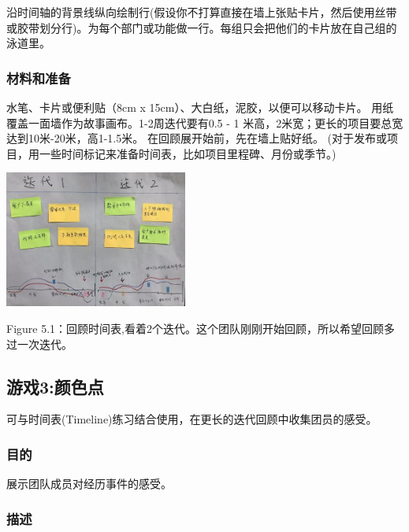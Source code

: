 沿时间轴的背景线纵向绘制行(假设你不打算直接在墙上张贴卡片，然后使用丝带或胶带划分行)。为每个部门或功能做一行。每组只会把他们的卡片放在自己组的泳道里。

\hypertarget{ux6750ux6599ux548cux51c6ux5907-1}{%
\subsubsection{材料和准备}\label{ux6750ux6599ux548cux51c6ux5907-1}}

水笔、卡片或便利贴（8cm x 15cm）、大白纸，泥胶，以便可以移动卡片。
用纸覆盖一面墙作为故事画布。1-2周迭代要有0.5 - 1
米高，2米宽；更长的项目要总宽达到10米-20米，高1-1.5米。
在回顾展开始前，先在墙上贴好纸。
(对于发布或项目，用一些时间标记来准备时间表，比如项目里程碑、月份或季节。)


\includegraphics[width=6cm]{Timeline20.jpg}

Figure
5.1：回顾时间表,看着2个迭代。这个团队刚刚开始回顾，所以希望回顾多过一次迭代。

\hypertarget{ux6e38ux620f3ux989cux8272ux70b9}{%
\subsection{游戏3:颜色点}\label{ux6e38ux620f3ux989cux8272ux70b9}}

可与时间表(Timeline)练习结合使用，在更长的迭代回顾中收集团员的感受。

\hypertarget{ux76eeux7684-2}{%
\subsubsection{目的}\label{ux76eeux7684-2}}

展示团队成员对经历事件的感受。

\hypertarget{ux63cfux8ff0-2}{%
\subsubsection{描述}\label{ux63cfux8ff0-2}}

